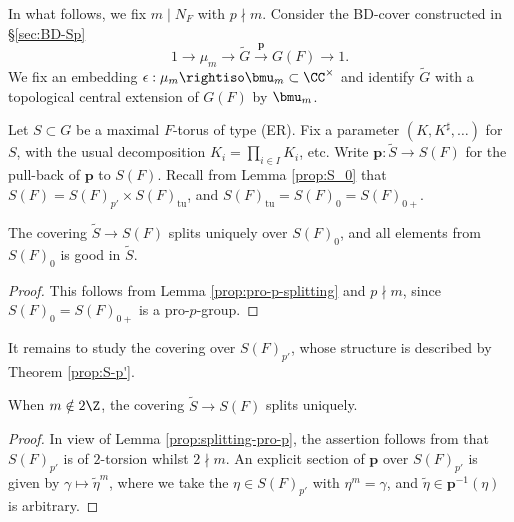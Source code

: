 \documentclass[a4paper,10pt]{article}
\begin{document}
In what follows, we fix $m \mid N_F$ with $p \nmid m$. Consider the BD-cover constructed in \S\ref{sec:BD-Sp}
\[ 1 \to \mu_m \to \tilde{G} \xrightarrow{\bm{p}} G(F) \to 1. \]
We fix an embedding $\epsilon: \mu_m \rightiso \bmu_m \subset \CC^\times$ and identify $\tilde{G}$ with a topological central extension of $G(F)$ by $\bmu_m$.

Let $S \subset G$ be a maximal $F$-torus of type (ER). Fix a parameter $(K, K^\sharp, \ldots)$ for $S$, with the usual decomposition $K_i = \prod_{i \in I} K_i$, etc. Write $\bm{p}: \tilde{S} \to S(F)$ for the pull-back of $\bm{p}$ to $S(F)$. Recall from Lemma \ref{prop:S_0} that $S(F) = S(F)_{p'} \times S(F)_{\text{tu}}$, and $S(F)_{\text{tu}} = S(F)_0 = S(F)_{0+}$.

\begin{lemma}\label{prop:splitting-pro-p}
	The covering $\tilde{S} \to S(F)$ splits uniquely over $S(F)_0$, and all elements from $S(F)_0$ is good in $\tilde{S}$.
\end{lemma}
\begin{proof}
	This follows from Lemma \ref{prop:pro-p-splitting} and $p \nmid m$, since $S(F)_0 = S(F)_{0+}$ is a pro-$p$-group.
\end{proof}
It remains to study the covering over $S(F)_{p'}$, whose structure is described by Theorem \ref{prop:S-p'}.

\begin{proposition}\label{prop:S-splitting-odd}
	When $m \notin 2\Z$, the covering $\tilde{S} \to S(F)$ splits uniquely.  
\end{proposition}
\begin{proof}
	In view of Lemma \ref{prop:splitting-pro-p}, the assertion follows from that $S(F)_{p'}$ is of $2$-torsion whilst $2 \nmid m$. An explicit section of $\bm{p}$ over $S(F)_{p'}$ is given by $\gamma \mapsto \tilde{\eta}^m$, where we take the $\eta \in S(F)_{p'}$ with $\eta^m = \gamma$, and $\tilde{\eta} \in \bm{p}^{-1}(\eta)$ is arbitrary.
\end{proof}
\end{document}
